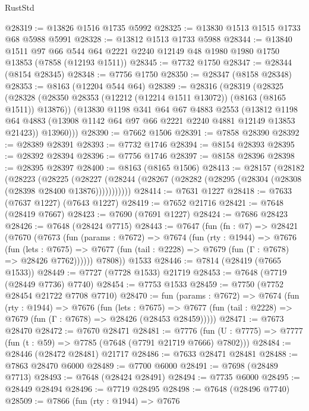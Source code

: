 \begin{lexlean}{RustStd}
\begin{coremodule}
{\begin{coremodule}
{{{{{{{{{{{{{{{{{{{{{{{{{{{{{{{{{{{{{{{{{{{{{{{{{{{{{@28319 := @13826 @1516 @1735 @5992
@28325 := @13830 @1513 @1515 @1733 @68 @5988 @5991
@28328 := @13812 @1513 @1733 @5988
@28344 := @13840
    @1511
    @97
    @66
    @544
    @64
    @2221
    @2240
    @12149
    @48
    @1980
    @1980
    @1750
    @13853
    (@7858 (@12193 @1511))
@28345 := @7732 @1750
@28347 := @28344 (@8154 @28345)
@28348 := @7756 @1750
@28350 := @28347 (@8158 @28348)
@28353 := @8163 (@12204 @544 @64)
@28389 := @28316
    (@28319
      (@28325
        (@28328 (@28350 @28353 (@12212 (@12214 @1511 @13072)) (@8163 (@8165 @1511)) @13876))
        (@13830
          @1198
          @341
          @64
          @67
          @4883
          @2553
          (@13812 @1198 @64 @4883 (@13908 @1142 @64 @97 @66 @2221 @2240 @4881 @12149 @13853 @21423))
          @13960)))
@28390 := @7662 @1506
@28391 := @7858 @28390
@28392 := @28389 @28391
@28393 := @7732 @1746
@28394 := @8154 @28393
@28395 := @28392 @28394
@28396 := @7756 @1746
@28397 := @8158 @28396
@28398 := @28395 @28397
@28400 := @8163 (@8165 @1506)
@28413 := @28157
    (@28182
      (@28223
        (@28225
          (@28227 (@28244 (@28267 (@28282 (@28295 (@28304 (@28308 (@28398 @28400 @13876)))))))))))
@28414 := @7631 @1227
@28418 := @7633 (@7637 @1227) (@7643 @1227)
@28419 := @7652 @21716
@28421 := @7648 (@28419 @7667)
@28423 := @7690 (@7691 @1227)
@28424 := @7686 @28423
@28426 := @7648 (@28424 @7715)
@28443 := @7647
    (fun (fn : @7) =>
    @28421
      (@7670
        (@7673
          (fun (params : @7672) =>
          @7674
            (fun (rty : @1944) =>
            @7676
              (fun (lets : @7675) =>
              @7677 (fun (tail : @2228) => @7679 (fun (Γ : @7678) => @28426 @7762))))))
        @7808))
    @1533
@28446 := @7814 (@28419 (@7665 @1533))
@28449 := @7727 (@7728 @1533) @21719
@28453 := @7648 (@7719 (@28449 @7736) @7740)
@28454 := @7753 @1533
@28459 := @7750 (@7752 @28454 @21722 @7708 @7710)
@28470 := fun (params : @7672) =>
  @7674
    (fun (rty : @1944) =>
    @7676
      (fun (lets : @7675) =>
      @7677 (fun (tail : @2228) => @7679 (fun (Γ : @7678) => @28426 (@28453 @28459)))))
@28471 := @7673 @28470
@28472 := @7670 @28471
@28481 := @7776
    (fun (U : @7775) => @7777 (fun (t : @59) => @7785 (@7648 (@7791 @21719 @7666) @7802)))
@28484 := @28446 (@28472 @28481) @21717
@28486 := @7633 @28471 @28481
@28488 := @7863 @28470 @6000
@28489 := @7700 @6000
@28491 := @7698 (@28489 @7713)
@28493 := @7648 (@28424 @28491)
@28494 := @7735 @6000
@28495 := @28449 @28494
@28496 := @7719 @28495
@28498 := @7648 (@28496 @7740)
@28509 := @7866
    (fun (rty : @1944) =>
    @7676
}}}}}}}}}}}}}}}}}}}}}}}}}}}}}}}}}}}}}}}}}}}}}}}}}}}}}
\end{coremodule}}
\end{coremodule}
\end{lexlean}
